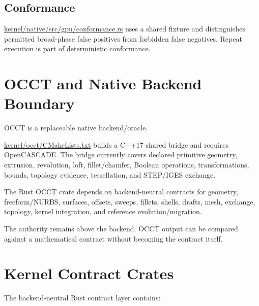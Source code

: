 \documentclass[11pt,a4paper]{report}
\newcommand{\pathref}[1]{\url{#1}}
\begin{document}
\section{Conformance}
\pathref{kernel/native/src/gpu/conformance.rs} uses a shared fixture and distinguishes permitted broad-phase false positives from forbidden false negatives. Repeat execution is part of deterministic conformance.

\chapter{OCCT and Native Backend Boundary}

OCCT is a replaceable native backend/oracle.

\pathref{kernel/occt/CMakeLists.txt} builds a C++17 shared bridge and requires OpenCASCADE. The bridge currently covers declared primitive geometry, extrusion, revolution, loft, fillet/chamfer, Boolean operations, transformations, bounds, topology evidence, tessellation, and STEP/IGES exchange.

The Rust OCCT crate depends on backend-neutral contracts for geometry, freeform/NURBS, surfaces, offsets, sweeps, fillets, shells, drafts, mesh, exchange, topology, kernel integration, and reference evolution/migration.

The authority remains above the backend. OCCT output can be compared against a mathematical contract without becoming the contract itself.

\chapter{Kernel Contract Crates}

The backend-neutral Rust contract layer contains:
\end{document}
